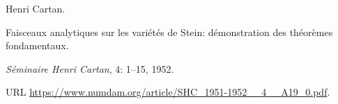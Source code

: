Henri Cartan.

\newblock Faisceaux analytiques sur les vari{\'e}t{\'e}s de {Stein}:
  d{\'e}monstration des th{\'e}or{\`e}mes fondamentaux.

\newblock \emph{S{\'e}minaire Henri Cartan}, 4: 1--15, 1952.

\newblock URL \url{https://www.numdam.org/article/SHC_1951-1952__4__A19_0.pdf}.
